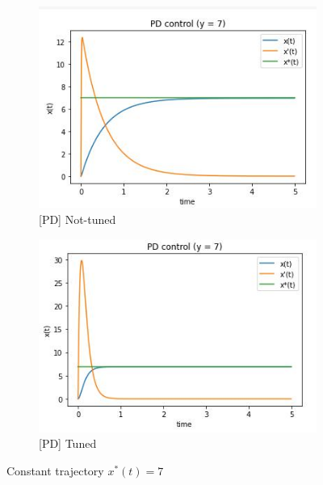 \documentclass[12pt,letterpaper]{article}
\begin{document}
    \begin{figure}[htb]
        \begin{subfigure}{.5\textwidth}
            \centering
            \includegraphics[width=1\linewidth]{images/output/300_150_0-C7.jpg}
            \caption{[PD] Not-tuned}
        \end{subfigure}
        \begin{subfigure}{.5\textwidth}
          \centering
          \includegraphics[width=1\linewidth]{images/output/143_12_0-C7.jpg}
          \caption{[PD] Tuned}
        \end{subfigure}
    \caption{Constant trajectory $x^*(t) = 7$}
    \label{fig:PD_const}
    \end{figure}
    
\end{document}
